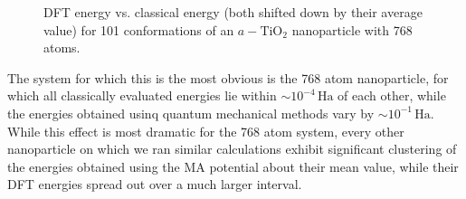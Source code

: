 \documentclass[aps,prb,twocolumn,amsmath,amssymb,superscriptaddress,longbibliography]{revtex4-1}
\newcommand\tab[1][1cm]{\hspace*{#1}} %
\begin{document}
\begin{figure}[htb]
\caption{DFT energy vs. classical energy (both shifted down by their average value) for 101 conformations of an $a-\text{TiO}_2$ nanoparticle with 768 atoms.}
\label{nnp_768}
\end{figure}

\tab The system for which this is the most obvious is the 768 atom nanoparticle, for which all classically evaluated energies lie within $\sim 10^{-4}\,\text{Ha}$ of each other, while the energies obtained usinq quantum mechanical methods vary by $\sim 10^{-1}\,\text{Ha}$.
While this effect is most dramatic for the 768 atom system, every other nanoparticle on which we ran similar calculations exhibit significant clustering of the energies obtained using the MA potential about their mean value, while their DFT energies spread out over a much larger interval\cite{realistic_nnp}.
\end{document}
